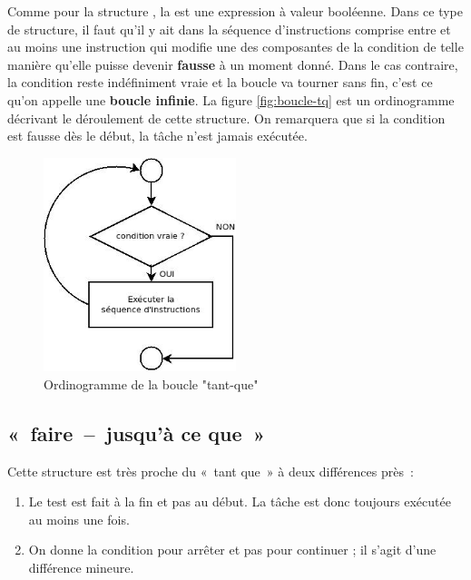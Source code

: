 		Comme pour la structure , 
		la  est une expression à valeur booléenne. 
		Dans ce type de structure, 
		il faut qu’il y ait dans la séquence d’instructions comprise entre
		 et  au moins une
		instruction qui modifie une des composantes de la condition de telle
		manière qu’elle puisse devenir \textbf{fausse} à un moment donné. Dans
		le cas contraire, la condition reste indéfiniment vraie et la boucle va
		tourner sans fin, c’est ce qu’on appelle une \textbf{boucle infinie}. 
		La figure \vref{fig:boucle-tq} est un ordinogramme 
		décrivant le déroulement de cette structure. 
		On remarquera que si la condition est fausse dès le début, 
		la tâche n’est jamais exécutée.

		\begin{figure}[h]
		\centering
		\includegraphics[width=0.5\textwidth]{image/boucle-tq}
		\caption{Ordinogramme de la boucle "tant-que"}
		\label{fig:boucle-tq}
		\end{figure}
		
	\subsection{«~faire~–~jusqu’à ce que~»}

		Cette structure est très proche du «~tant que~» 
		à deux différences près~:
	
		\begin{enumerate}
		\item
			Le test est fait à la fin et pas au début. 
			La tâche est donc toujours exécutée au moins une fois.
		\item 
			On donne la condition pour arrêter et pas pour continuer ; 
			il s’agit d’une différence mineure.
		\end{enumerate}

